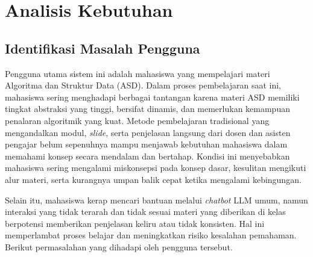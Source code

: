 \section{Analisis Kebutuhan}

\subsection{Identifikasi Masalah Pengguna}

Pengguna utama sistem ini adalah mahasiswa yang mempelajari materi Algoritma dan Struktur Data (ASD). Dalam proses pembelajaran saat ini, mahasiswa sering menghadapi berbagai tantangan karena materi ASD memiliki tingkat abstraksi yang tinggi, bersifat dinamis, dan memerlukan kemampuan penalaran algoritmik yang kuat. Metode pembelajaran tradisional yang mengandalkan modul, \textit{slide}, serta penjelasan langsung dari dosen dan asisten pengajar belum sepenuhnya mampu menjawab kebutuhan mahasiswa dalam memahami konsep secara mendalam dan bertahap. Kondisi ini menyebabkan mahasiswa sering mengalami miskonsepsi pada konsep dasar, kesulitan mengikuti alur materi, serta kurangnya umpan balik cepat ketika mengalami kebingungan.

Selain itu, mahasiswa kerap mencari bantuan melalui \textit{chatbot} LLM umum, namun interaksi yang tidak terarah dan tidak sesuai materi yang diberikan di kelas berpotensi memberikan penjelasan keliru atau tidak konsisten. Hal ini memperlambat proses belajar dan meningkatkan risiko kesalahan pemahaman. Berikut permasalahan yang dihadapi oleh pengguna tersebut.

